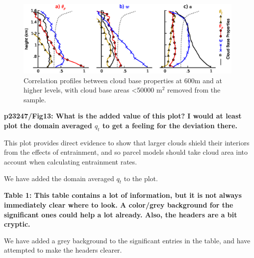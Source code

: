 \documentclass[12pt]{article}
\begin{document}
\begin{figure}[t]
\begin{center}
\includegraphics[width=\textwidth]{cloud_base_profiles_nosmall.eps}
\end{center}
\caption{Correlation profiles between cloud base properties at 600m and at 
higher levels, with cloud base areas \textless 50000 m$^2$ removed from the 
sample.}
\end{figure}

\vspace{5mm}

\textbf{p23247/Fig13: What is the added value of this plot? I would at least 
plot the domain averaged $q_t$ to get a feeling for the deviation there.}

\vspace{5mm}

This plot provides direct evidence to show that larger clouds shield their 
interiors from the effects of entrainment, and so parcel models should take 
cloud area into account when calculating entrainment rates.

We have added the domain averaged $q_t$ to the plot.

\vspace{5mm}

\textbf{Table 1: This table contains a lot of information, but it is not 
always immediately clear where to look. A color/grey background for the 
significant ones could help a lot already. Also, the headers are a bit 
cryptic.}

\vspace{5mm}

We have added a grey background to the significant entries in the table, and 
have attempted to make the headers clearer. 

\vspace{5mm}
\end{document}
